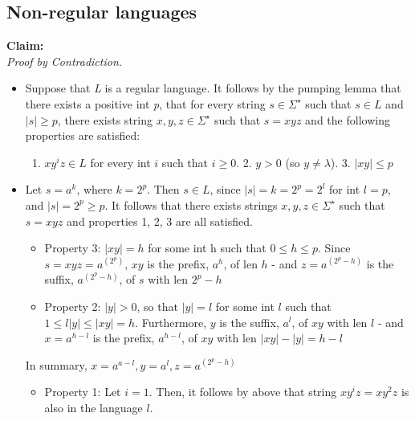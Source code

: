 \documentclass{article}
\begin{document}
\subsection*{Non-regular languages}
\textbf{Claim:} \\
\textit{Proof by Contradiction.}
\begin{itemize}
    \item Suppose that \textit{L} is a regular language. It follows by the pumping lemma that there exists a positive int \textit{p}, that for every string
    $s\in\Sigma^\star$ such that $s\in L$ and $|s|\geq p$, there exists string $x,y,z \in\Sigma^\star$ such that $s=xyz$ and the following properties are 
    satisfied:
    \begin{enumerate}
        \item $xy^iz\in L$ for every int $i$ such that $i\geq0$. 2. $y>0$ (so $y\neq\lambda$). 3. $|xy|\leq p$
    \end{enumerate}
    \item Let $s=a^k$, where $k=2^p$. Then $s\in L$, since $|s|=k=2^p=2^l$ for int $l=p$, and $|s|=2^p\geq p$. It follows that there exists strings 
    $x,y,z\in\Sigma^\star$ such that $s=xyz$ and properties 1, 2, 3 are all satisfied.
    \begin{itemize}
        \item Property 3: $|xy|=h$ for some int h such that $0\leq h\leq p$. Since $s=xyz=a^{(2^p)}$, $xy$ is the prefix, $a^h$, of len $h$ - 
        and $z=a^{(2^p-h)}$ is the suffix, $a^{(2^p-h)}$, of $s$ with len $2^p-h$
        \item Property 2: $|y|>0$, so that $|y|=l$ for some int $l$ such that $1\leq l  |y|\leq |xy|=h$. Furthermore, $y$ is the suffix, $a^l$, of 
        $xy$ with len $l$ - and $x=a^{h-l}$ is the prefix, $a^{h-l}$, of $xy$ with len $|xy|-|y|=h-l$
    \end{itemize}
    In summary, $x=a^{a-l},y=a^l,z=a^{(2^p-h)}$
    \begin{itemize}
        \item Property 1: Let $i=1$. Then, it follows by above that string $xy^iz=xy^2z$ is also in the language $l$.
    \end{itemize}
\end{itemize}
\end{document}
